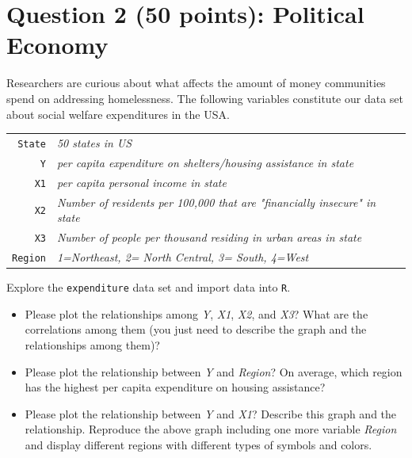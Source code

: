\documentclass[12pt,letterpaper]{article}
\begin{document}
\newpage

	\section*{Question 2 (50 points): Political Economy}

\noindent Researchers are curious about what affects the amount of money communities spend on addressing homelessness. The following variables constitute our data set about social welfare expenditures in the USA. \\
\vspace{.5cm}


\begin{tabular}{r|l}
	\texttt{State} &\emph{50 states in US} \\
	\texttt{Y} & \emph{per capita expenditure on shelters/housing assistance in state}\\
	\texttt{X1} &\emph{per capita personal income in state} \\
	\texttt{X2} &  \emph{Number of residents per 100,000 that are "financially insecure" in state}\\
	\texttt{X3} &  \emph{Number of people per thousand residing in urban areas in state} \\
	\texttt{Region} &  \emph{1=Northeast, 2= North Central, 3= South, 4=West} \\
\end{tabular}

\vspace{.5cm}
\noindent Explore the \texttt{expenditure} data set and import data into \texttt{R}.
\vspace{.5cm}
  
\vspace{.5cm}
\begin{itemize}

\item
Please plot the relationships among \emph{Y}, \emph{X1}, \emph{X2}, and \emph{X3}? What are the correlations among them (you just need to describe the graph and the relationships among them)?
\vspace{.5cm}
\item
Please plot the relationship between \emph{Y} and \emph{Region}? On average, which region has the highest per capita expenditure on housing assistance?
\vspace{.5cm}
\item
Please plot the relationship between \emph{Y} and \emph{X1}? Describe this graph and the relationship. Reproduce the above graph including one more variable \emph{Region} and display different regions with different types of symbols and colors.
\end{itemize}
\end{document}
